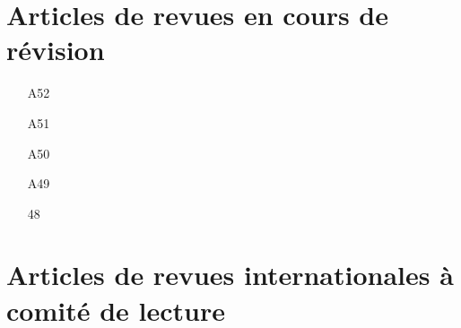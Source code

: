 \documentclass[9pt,french,a4paper,oneside]{article}%
\begin{document}
\section{Articles de revues en cours de révision}%
\begin{enumerate}

\item[A52] %

\item[A51] %

\item[A50] %

\item[A49] %

\item[48] %

\end{enumerate}

\section{Articles de revues internationales à comité de lecture}%
\end{document}

